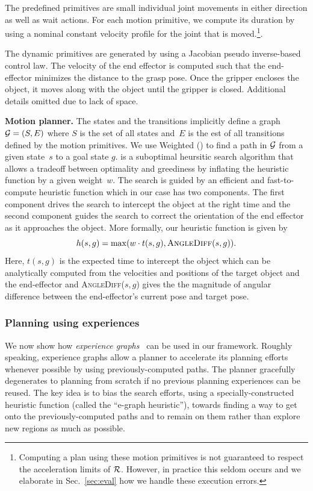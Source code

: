 \documentclass[conference]{IEEEtran}
\begin{document}
The predefined primitives are small individual joint movements in either direction as well as wait actions.
For each motion primitive, we compute its duration by using a nominal constant velocity profile for the  joint that is moved.\footnote{Computing a plan using these motion primitives is not guaranteed to respect the acceleration limits of $\mathcal{R}$. However, in practice this seldom occurs and we elaborate in Sec.~\ref{sec:eval} how we handle these execution errors.}.
%

The dynamic primitives are generated by using a Jacobian pseudo inverse-based control law. 
The velocity of the end effector is computed such that the end-effector minimizes the distance to the grasp pose. Once the gripper encloses the object, it moves along with the object until the gripper is closed.
Additional details omitted due to lack of space.

\textbf{Motion planner.}
The states and the transitions implicitly define a graph $\mathcal{G} = (S,E)$ where $S$ is the set of all states and~$E$ is the est of all transitions defined by the motion primitives. We use Weighted \astar (\wastar) to find a path in $\mathcal{G}$ from a given state~$s$ to a goal state $g$. 
\wastar is a suboptimal heursitic search algorithm that allows a tradeoff between optimality and greediness by inflating the heuristic function by a given weight~$w$. 
The search is guided by an efficient and fast-to-compute heuristic function which in our case has two components.
The first component drives the search to intercept the object at the right time and 
the second component guides the search to correct the orientation of the end effector as it approaches the object. 
More formally, our heuristic function is given by
$$
 h(s,g) = \max (w \cdot t(s,g), \textsc{AngleDiff}(s,g)).
$$
Here, $t(s,g)$ is the expected time to intercept the object which can be analytically computed from the velocities and positions of the target object and the end-effector and \textsc{AngleDiff}($s,g$) gives the the magnitude of angular difference between the end-effector's current pose and target pose.

\subsubsection{Planning using experiences}
We now show how \emph{experience graphs}~\cite{PCCL12} can be used in our framework.
%
Roughly speaking, experience graphs allow a planner  to accelerate its planning efforts whenever possible by using previously-computed paths. The planner gracefully degenerates to planning from scratch if no previous planning experiences can be reused.
%
The key idea is to bias the search efforts, using a specially-constructed heuristic function (called the ``e-graph heuristic''), towards finding a way to get onto the previously-computed paths and to remain on them rather than explore new regions as much as possible. 
\end{document}
